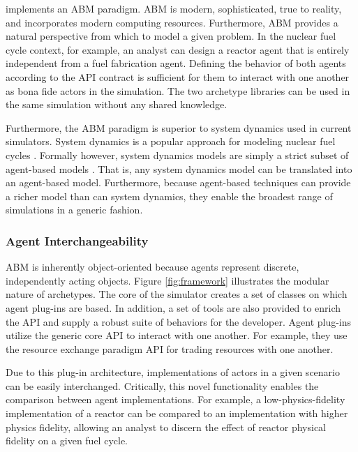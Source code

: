 \Cyclus implements an \acrlong{ABM} paradigm.  \gls{ABM} is modern, sophisticated,
true to reality, and incorporates modern computing resources.
Furthermore, \gls{ABM} provides a natural
perspective from which to model a given problem. In the nuclear fuel cycle
context, for example, an analyst can design a reactor agent
that is entirely independent from a fuel fabrication agent. Defining the behavior of both agents according to the
\gls{API} contract is sufficient for them to interact with one another as
bona fide actors in the simulation.  The two archetype libraries can be used in the same
simulation without any shared knowledge.

Furthermore, the \gls{ABM} paradigm is superior to system dynamics used in
current simulators.
System dynamics is a popular approach for modeling nuclear fuel cycles
\cite{jacobson_vision_2009,van_den_durpel_daness_2009,guerin_impact_2009,guerin_benchmark_2009}.
Formally however, system dynamics models are simply a strict subset of agent-based models
\cite{macal_agent-based_2010}.
That is, any system dynamics model can be translated
into an agent-based model. Furthermore, because agent-based
techniques can provide a richer model than can system dynamics, they enable the
broadest range of simulations in a generic fashion.

\subsubsection{Agent Interchangeability}\label{sec:interchangeability}


\gls{ABM} is inherently object-oriented because agents represent discrete,
independently acting objects.  Figure \ref{fig:framework} illustrates the
modular nature of \Cyclus archetypes.  The core of the \Cyclus simulator creates
a set of classes on which agent plug-ins are based. In addition, a set of tools
are also provided to enrich the \gls{API} and supply a robust suite of behaviors
for the developer.  Agent plug-ins utilize the generic core \gls{API} to
interact with one another.  For example, they use the resource exchange paradigm
\gls{API} for trading resources with one another.

Due to this plug-in architecture,
implementations of actors in a given scenario can be easily
interchanged. Critically, this novel functionality enables the comparison
between agent implementations. For example, a low-physics-fidelity
implementation of a reactor can be compared to an implementation with higher
physics fidelity, allowing an analyst to discern the effect of reactor physical
fidelity on a given fuel cycle.


